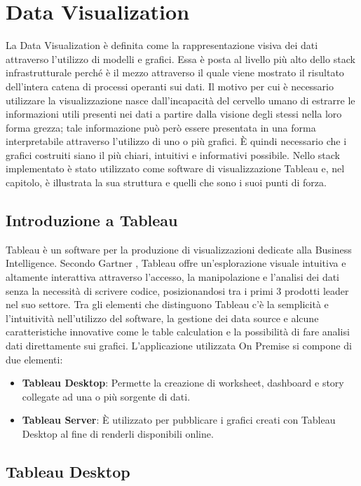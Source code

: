 \chapter{Data Visualization}

La Data Visualization è definita come la rappresentazione visiva dei dati attraverso l'utilizzo di modelli e grafici. Essa è posta al livello più alto dello stack infrastrutturale perché è il mezzo attraverso il quale viene mostrato il risultato dell'intera catena di processi operanti sui dati. Il motivo per cui è necessario utilizzare la visualizzazione nasce dall'incapacità del cervello umano di estrarre le informazioni utili presenti nei dati a partire dalla visione degli stessi nella loro forma grezza; tale informazione può però essere presentata in una forma interpretabile attraverso l'utilizzo di uno o più grafici. È quindi necessario che i grafici costruiti siano il più chiari, intuitivi e informativi possibile. Nello stack implementato è stato utilizzato come software di visualizzazione Tableau e, nel capitolo, è illustrata la sua struttura e quelli che sono i suoi punti di forza.

\section{Introduzione a Tableau}

Tableau è un software per la produzione di visualizzazioni dedicate alla Business Intelligence. Secondo Gartner \cite{gartner_tableau}, Tableau offre un'esplorazione visuale intuitiva e altamente interattiva attraverso l'accesso, la manipolazione e l'analisi dei dati senza la necessità di scrivere codice, posizionandosi tra i primi 3 prodotti leader nel suo settore. Tra gli elementi che distinguono Tableau c'è la semplicità e l'intuitività nell'utilizzo del software, la gestione dei data source e alcune caratteristiche innovative come le table calculation e la possibilità di fare analisi dati direttamente sui grafici. L'applicazione utilizzata On Premise si compone di due elementi:
\begin{itemize}
    \item \textbf{Tableau Desktop}: Permette la creazione di worksheet, dashboard e story collegate ad una o più sorgente di dati.
    \item \textbf{Tableau Server}: È utilizzato per pubblicare i grafici creati con Tableau Desktop al fine di renderli disponibili online.
\end{itemize}
\section{Tableau Desktop}

